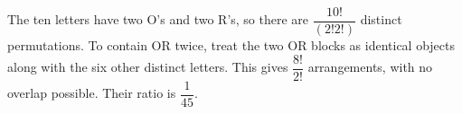 The ten letters have two O's and two R's, so there are $\dfrac{10!}{(2!2!)}$ distinct permutations. To contain OR twice, treat the two OR blocks as identical objects along with the six other distinct letters. This gives $\dfrac{8!}{2!}$ arrangements, with no overlap possible. Their ratio is $\boxed{\dfrac{1}{45}}$.
